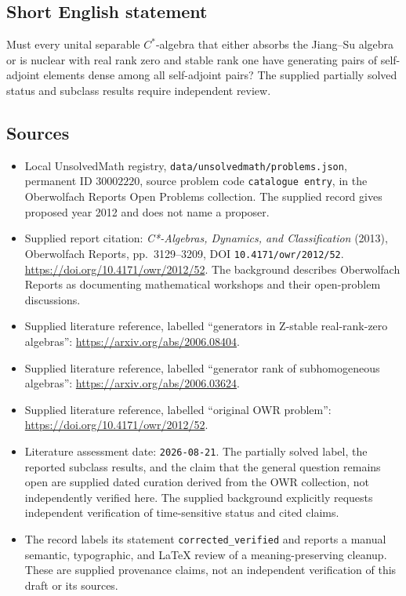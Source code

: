 \documentclass[11pt]{article}
\begin{document}
\subsection{Short English statement}
Must every unital separable \(C^*\)-algebra that either absorbs the Jiang--Su algebra or is nuclear with real rank zero and stable rank one have generating pairs of self-adjoint elements dense among all self-adjoint pairs? The supplied partially solved status and subclass results require independent review.
\subsection{Sources}
\begin{itemize}
\item Local UnsolvedMath registry, \texttt{data/unsolvedmath/problems.json}, permanent ID \(30002220\), source problem code \texttt{catalogue entry}, in the Oberwolfach Reports Open Problems collection. The supplied record gives proposed year 2012 and does not name a proposer.
\item Supplied report citation: \emph{C*-Algebras, Dynamics, and Classification} (2013), Oberwolfach Reports, pp.\ 3129--3209, DOI \texttt{10.4171/owr/2012/52}. \url{https://doi.org/10.4171/owr/2012/52}. The background describes Oberwolfach Reports as documenting mathematical workshops and their open-problem discussions.
\item Supplied literature reference, labelled ``generators in Z-stable real-rank-zero algebras'': \url{https://arxiv.org/abs/2006.08404}.
\item Supplied literature reference, labelled ``generator rank of subhomogeneous algebras'': \url{https://arxiv.org/abs/2006.03624}.
\item Supplied literature reference, labelled ``original OWR problem'': \url{https://doi.org/10.4171/owr/2012/52}.
\item Literature assessment date: \texttt{2026-08-21}. The partially solved label, the reported subclass results, and the claim that the general question remains open are supplied dated curation derived from the OWR collection, not independently verified here. The supplied background explicitly requests independent verification of time-sensitive status and cited claims.
\item The record labels its statement \texttt{corrected\_verified} and reports a manual semantic, typographic, and LaTeX review of a meaning-preserving cleanup. These are supplied provenance claims, not an independent verification of this draft or its sources.
\end{itemize}
\end{document}
